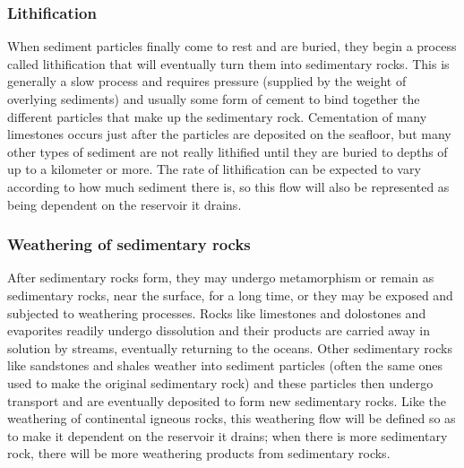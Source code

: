 \documentclass[11pt,letterpaper]{article}
\begin{document}
\subsubsection{Lithification}
When sediment particles finally come to rest and are buried, they begin a process called lithification that will eventually turn them into sedimentary rocks. This is generally a slow process and requires pressure (supplied by the weight of overlying sediments) and usually some form of cement to bind together the different particles that make up the sedimentary rock. Cementation of many limestones occurs just after the particles are deposited on the seafloor, but many other types of sediment are not really lithified until they are buried to depths of up to a kilometer or more. The rate of lithification can be expected to vary according to how much sediment there is, so this flow will also be represented as being dependent on the reservoir it drains.

\subsubsection{Weathering of sedimentary rocks}
After sedimentary rocks form, they may undergo metamorphism or remain as sedimentary rocks, near the surface, for a long time, or they may be exposed and subjected to weathering processes. Rocks like limestones and dolostones and evaporites readily undergo dissolution and their products are carried away in solution by streams, eventually returning to the oceans. Other sedimentary rocks like sandstones and shales weather into sediment particles (often the same ones used to make the original sedimentary rock) and these particles then undergo transport and are eventually deposited to form new sedimentary rocks. Like the weathering of continental igneous rocks, this weathering flow will be defined so as to make it dependent on the reservoir it drains; when there is more sedimentary rock, there will be more weathering products from sedimentary rocks.
\end{document}
